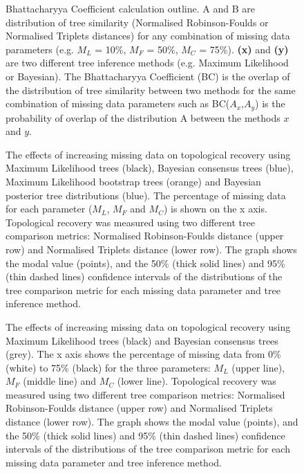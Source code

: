 \documentclass[12pt,letterpaper]{article}
\begin{document}
\begin{figure}
\caption{Bhattacharyya Coefficient calculation outline. A and B are distribution of tree similarity (Normalised Robinson-Foulds or Normalised Triplets distances) for any combination of missing data parameters (e.g. $M_{L}$ = 10\%, $M_{F}$ = 50\%, $M_{C}$ = 75\%). \textbf{(x)} and \textbf{(y)} are two different tree inference methods (e.g. Maximum Likelihood or Bayesian). The Bhattacharyya Coefficient (BC) is the overlap of the distribution of tree similarity between two methods for the same combination of missing data parameters such as BC($A_{x}$,$A_{y}$) is the probability of overlap of the distribution A between the methods $x$ and $y$.}
\label{Fig_Bhattacharyya_Coefficients2} %
\end{figure}

\begin{figure}
\caption{The effects of increasing missing data on topological recovery using Maximum Likelihood trees (black), Bayesian consensus trees (blue), Maximum Likelihood bootstrap trees (orange) and Bayesian posterior tree distributions (blue). The percentage of missing data for each parameter ($M_{L}$, $M_{F}$ and $M_{C}$) is shown on the x axis. Topological recovery was measured using two different tree comparison metrics: Normalised Robinson-Foulds distance (upper row) and Normalised Triplets distance (lower row). The graph shows the modal value (points), and the 50\% (thick solid lines) and 95\% (thin dashed lines) confidence intervals of the distributions of the tree comparison metric for each missing data parameter and tree inference method.}
\label{Fig_Results-permeth_perparam} %
\end{figure}

\begin{figure}
\caption{The effects of increasing missing data on topological recovery using Maximum Likelihood trees (black) and Bayesian consensus trees (grey). The x axis shows the percentage of missing data from 0\% (white) to 75\% (black) for the three parameters: $M_{L}$ (upper line), $M_{F}$ (middle line) and $M_{C}$ (lower line). Topological recovery was measured using two different tree comparison metrics: Normalised Robinson-Foulds distance (upper row) and Normalised Triplets distance (lower row). The graph shows the modal value (points), and the 50\% (thick solid lines) and 95\% (thin dashed lines) confidence intervals of the distributions of the tree comparison metric for each missing data parameter and tree inference method.} 
\label{Fig_Results-global_perparam} %
\end{figure}
\end{document}
